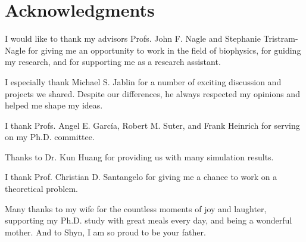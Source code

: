 \section*{Acknowledgments}

I would like to thank my advisors Profs. John F. Nagle and Stephanie
Tristram-Nagle for giving me an opportunity to work in the field of biophysics,
for guiding my research, and for supporting me as a research assistant. 

I especially thank Michael S. Jablin for a number of exciting discussion and 
projects we shared. Despite our differences, he always respected my opinions
and helped me shape my ideas.

I thank Profs. Angel E. Garc\'{i}a, Robert M. Suter, and Frank Heinrich
for serving on my Ph.D. committee.

Thanks to Dr. Kun Huang for providing us with many simulation results.

I thank Prof. Christian D. Santangelo for giving me a chance to work on 
a theoretical problem. 

Many thanks to my wife for the countless moments of joy and laughter,
supporting my Ph.D. study with great meals every day, and being a wonderful 
mother.
And to Shyn, I am so proud to be your father.